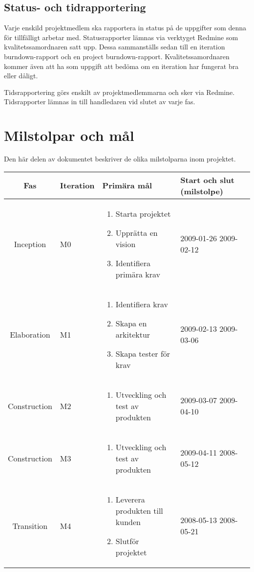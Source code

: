 \subsection{Status- och tidrapportering}
Varje enskild projektmedlem ska rapportera in status på de uppgifter som denna för tillfälligt arbetar med. Statusrapporter lämnas via verktyget Redmine som kvalitetssamordnaren satt upp. Dessa sammanställs sedan till en iteration burndown-rapport och en project burndown-rapport. Kvalitetssamordnaren kommer även att ha som uppgift att bedöma om en iteration har fungerat bra eller dåligt.

Tidsrapportering görs enskilt av projektmedlemmarna och sker via Redmine. Tidsrapporter lämnas in till handledaren vid slutet av varje fas.

\newpage

\section{Milstolpar och mål}
Den här delen av dokumentet beskriver de olika milstolparna inom projektet.

\begin{center}
	\begin{tabular}{| c | m{1.5cm} | m{5cm} | m{2.5cm} | m{2cm} |}
		\hline
		\textbf{Fas} & \textbf{Iteration} & \textbf{Primära mål} & \textbf{Start och slut (milstolpe)} \\
		\hline
		Inception & M0 & \begin{enumerate} \item Starta projektet \item Upprätta en vision \item Identifiera primära krav \end{enumerate} & 2009-01-26 2009-02-12 \\
		\hline
		Elaboration & M1 & \begin{enumerate} \item Identifiera krav \item Skapa en arkitektur \item Skapa tester för krav \end{enumerate} & 2009-02-13 2009-03-06 \\
		\hline
		Construction & M2 & \begin{enumerate} \item Utveckling och test av produkten \end{enumerate} & 2009-03-07 2009-04-10 \\
		\hline
		Construction & M3 & \begin{enumerate} \item Utveckling och test av produkten \end{enumerate} & 2009-04-11 2008-05-12 \\
		\hline
		Transition & M4 & \begin{enumerate} \item Leverera produkten till kunden \item Slutför projektet \end{enumerate} & 2008-05-13 2008-05-21 \\
		\hline
	\end{tabular}
\end{center}

